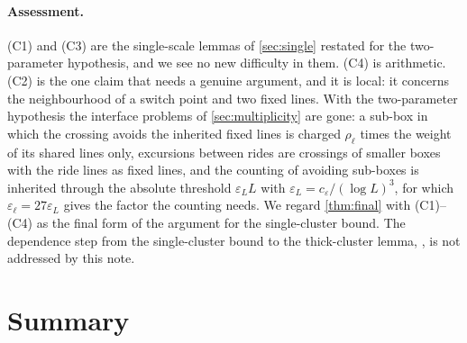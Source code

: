 \documentclass[11pt,letterpaper]{article}
\begin{document}
\paragraph{Assessment.} (C1) and (C3) are the single-scale lemmas of \cref{sec:single} restated for the two-parameter hypothesis, and we see no new difficulty in them. (C4) is arithmetic. (C2) is the one claim that needs a genuine argument, and it is local: it concerns the neighbourhood of a switch point and two fixed lines. With the two-parameter hypothesis the interface problems of \cref{sec:multiplicity} are gone: a sub-box in which the crossing avoids the inherited fixed lines is charged $\rho_\ell$ times the weight of its shared lines only, excursions between rides are crossings of smaller boxes with the ride lines as fixed lines, and the counting of avoiding sub-boxes is inherited through the absolute threshold $\varepsilon_LL$ with $\varepsilon_L=c_\varepsilon/(\log L)^3$, for which $\varepsilon_\ell=27\varepsilon_L$ gives the factor the counting needs. We regard \cref{thm:final} with (C1)--(C4) as the final form of the argument for the single-cluster bound. The dependence step from the single-cluster bound to the thick-cluster lemma, \cite[Section~3.1]{FM26}, is not addressed by this note.

\section{Summary}
\label{sec:summary}
\end{document}
